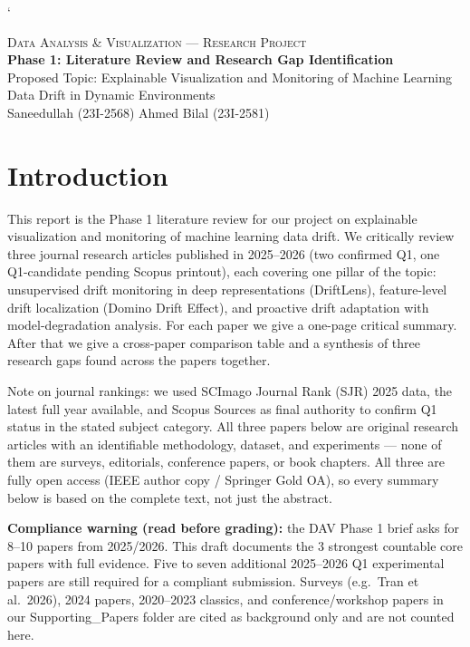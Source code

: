 `\documentclass[10pt]{article}
\begin{document}
\pagestyle{plain}

\begin{center}
	{\small \textsc{Data Analysis \& Visualization --- Research Project}}\\[4pt]
	{\LARGE \textbf{Phase 1: Literature Review and Research Gap Identification}}\\[6pt]
	{\large Proposed Topic: Explainable Visualization and Monitoring of Machine Learning Data Drift in Dynamic Environments}\\[10pt]
	{\normalsize Saneedullah (23I-2568) \quad\textbar\quad Ahmed Bilal (23I-2581)}
\end{center}

\vspace{4mm}

\section{Introduction}

This report is the Phase 1 literature review for our project on explainable visualization and monitoring of machine learning data drift. We critically review three journal research articles published in 2025--2026 (two confirmed Q1, one Q1-candidate pending Scopus printout), each covering one pillar of the topic: unsupervised drift monitoring in deep representations (DriftLens), feature-level drift localization (Domino Drift Effect), and proactive drift adaptation with model-degradation analysis. For each paper we give a one-page critical summary. After that we give a cross-paper comparison table and a synthesis of three research gaps found across the papers together.

Note on journal rankings: we used SCImago Journal Rank (SJR) 2025 data, the latest full year available, and Scopus Sources as final authority to confirm Q1 status in the stated subject category. All three papers below are original research articles with an identifiable methodology, dataset, and experiments --- none of them are surveys, editorials, conference papers, or book chapters. All three are fully open access (IEEE author copy / Springer Gold OA), so every summary below is based on the complete text, not just the abstract.

\textbf{Compliance warning (read before grading):} the DAV Phase 1 brief asks for 8--10 papers from 2025/2026. This draft documents the 3 strongest countable core papers with full evidence. Five to seven additional 2025--2026 Q1 experimental papers are still required for a compliant submission. Surveys (e.g.\ Tran et al.\ 2026), 2024 papers, 2020--2023 classics, and conference/workshop papers in our Supporting\_Papers folder are cited as background only and are not counted here.
\end{document}
